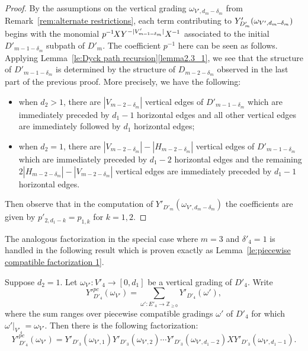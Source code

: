 \documentclass[ALCO,ThmDefs,Unicode,epreuves]{cedram}
\newcommand{\ZZ}{\mathbb{Z}}
\newcommand*{\mk}{\mkern -1mu}
\newcommand*{\Mk}{\mkern -2mu}
\begin{document}
\begin{proof}
 By the assumptions on the vertical grading $\omega_{V',d_m-\delta_m}$ from Remark~\ref{rem:alternate restrictions}, each term contributing to $Y'_{D'_m}(\omega_{V',d_m\Mk -\Mk \delta_m})$ begins with the monomial $p^{\mk -\mk 1}\Mk XY^{-|V'_{m\mk -\mk 1\mk -\mk \delta_m}|}X^{\mk -\mk 1}$ associated to the initial $D'_{m-1-\delta_m}$ subpath of $D'_m$.
 The coefficient $p^{-1}$ here can be seen as follows. 
 Applying Lemma~\ref{le:Dyck path recursion}\ref{lemma2.3_1}, we see that the structure of $D'_{m-1-\delta_m}$ is determined by the structure of $D_{m-2-\delta_m}$ observed in the last part of the previous proof.
 More precisely, we have the following:
 \begin{itemize}
 \item when $d_2>1$, there are $|V_{m-2-\delta_m}|$ vertical edges of $D'_{m-1-\delta_m}$ which are immediately preceded by $d_1-1$ horizontal edges and all other vertical edges are immediately followed by $d_1$ horizontal edges;
 \item when $d_2=1$, there are $|V_{m-2-\delta_m}|-|H_{m-2-\delta_m}|$ vertical edges of $D'_{m-1-\delta_m}$ which are immediately preceded by $d_1-2$ horizontal edges and the remaining $2|H_{m-2-\delta_m}|-|V_{m-2-\delta_m}|$ vertical edges are immediately preceded by $d_1-1$ horizontal edges.
 \end{itemize}
 Then observe that in the computation of $Y'_{D'_m}(\omega_{V',d_m-\delta_m})$ the coefficients are given by $p'_{2,d_1-k}=p_{1,k}$ for $k=1,2$.
\end{proof}

The analogous factorization in the special case where $m=3$ and $\delta'_4=1$ is handled in the following result which is proven exactly as Lemma~\ref{le:piecewise compatible factorization 1}.
\begin{lemma}
 \label{le:piecewise compatible factorization 3}
 Suppose $d_2=1$. Let $\omega_{V'}:V'_4\to[0,d_1]$ be a vertical grading of $D'_4$.
 Write 
 \[{Y'}_{D'_4}^{pc}(\omega_{V'})=\sum\limits_{\omega':E'_4\to\ZZ_{\ge0}} Y'_{D'_4}(\omega'),\]
 where the sum ranges over piecewise compatible gradings $\omega'$ of $D'_4$ for which $\omega'|_{V'_4}=\omega_{V'}$.
 Then there is the following factorization:
 \begin{equation}
 \label{eq:piecewise compatible factorization 3}
 {Y'}_{D'_4}^{pc}(\omega_{V'})=Y'_{D'_3}(\omega_{V',1})Y'_{D'_3}(\omega_{V',2})\cdots Y'_{D'_3}(\omega_{V',d_1-2})X Y'_{D'_3}(\omega_{V',d_1-1}).
 \end{equation}
\end{lemma}
\end{document}
